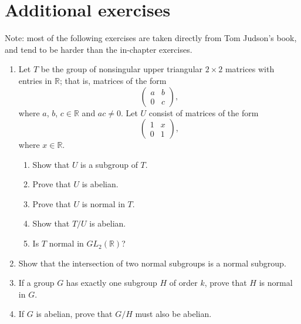 { 
\section*{Additional exercises}
\exrule
 
{\small
Note: most of the following exercises are taken directly from Tom Judson's book, and tend to be harder than the in-chapter exercises.

\begin{enumerate}
 
 

 
\item
Let $T$ be the group of nonsingular upper triangular $2 \times 2$
matrices with entries in ${\mathbb R}$; that is, matrices of the form
\[
\begin{pmatrix}
a & b \\
0 & c
\end{pmatrix},
\]
where $a$, $b$, $c \in {\mathbb R}$ and $ac \neq 0$. Let $U$ consist of
matrices of the form 
\[
\begin{pmatrix}
1 & x \\
0 & 1
\end{pmatrix},
\]
where $x \in {\mathbb R}$.
\begin{enumerate}
 
 \item 
Show that $U$ is a subgroup of $T$.
 
 \item 
Prove that $U$ is abelian.
 
 \item 
Prove that $U$ is normal in $T$.
 
 \item  
Show that $T/U$ is abelian.
 
 \item
Is $T$ normal in $GL_2( {\mathbb R})$?
 
\end{enumerate}


\item
Show that the intersection of two normal subgroups is a normal
subgroup. 

\item
If a group $G$ has exactly one subgroup $H$ of order $k$, prove that
$H$ is normal in $G$. 

\item
If $G$ is abelian, prove that $G/H$ must also be abelian.
 

\end{enumerate}}}
